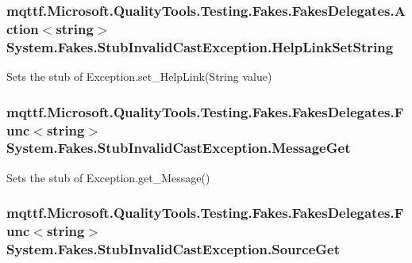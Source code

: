 \hypertarget{class_system_1_1_fakes_1_1_stub_invalid_cast_exception_a20d39cc0830156de5fb845160ebcec08}{
\subsubsection[{Help\-Link\-Set\-String}]{\setlength{\rightskip}{0pt plus 5cm}mqttf.\-Microsoft.\-Quality\-Tools.\-Testing.\-Fakes.\-Fakes\-Delegates.\-Action$<$string$>$ System.\-Fakes.\-Stub\-Invalid\-Cast\-Exception.\-Help\-Link\-Set\-String}}\label{class_system_1_1_fakes_1_1_stub_invalid_cast_exception_a20d39cc0830156de5fb845160ebcec08}


Sets the stub of Exception.\-set\-\_\-\-Help\-Link(\-String value)

\hypertarget{class_system_1_1_fakes_1_1_stub_invalid_cast_exception_ae688c3d0634143bca5537e8a7b8707de}{
\subsubsection[{Message\-Get}]{\setlength{\rightskip}{0pt plus 5cm}mqttf.\-Microsoft.\-Quality\-Tools.\-Testing.\-Fakes.\-Fakes\-Delegates.\-Func$<$string$>$ System.\-Fakes.\-Stub\-Invalid\-Cast\-Exception.\-Message\-Get}}\label{class_system_1_1_fakes_1_1_stub_invalid_cast_exception_ae688c3d0634143bca5537e8a7b8707de}


Sets the stub of Exception.\-get\-\_\-\-Message()

\hypertarget{class_system_1_1_fakes_1_1_stub_invalid_cast_exception_a834692a0cc67c6265ac2b3632b46d173}{
\subsubsection[{Source\-Get}]{\setlength{\rightskip}{0pt plus 5cm}mqttf.\-Microsoft.\-Quality\-Tools.\-Testing.\-Fakes.\-Fakes\-Delegates.\-Func$<$string$>$ System.\-Fakes.\-Stub\-Invalid\-Cast\-Exception.\-Source\-Get}}\label{class_system_1_1_fakes_1_1_stub_invalid_cast_exception_a834692a0cc67c6265ac2b3632b46d173}


